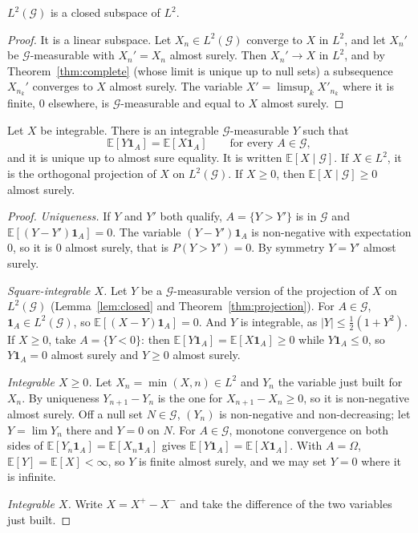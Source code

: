 \begin{lemma}\label{lem:closed}
$L^2(\mathcal G)$ is a closed subspace of $L^2$.
\end{lemma}
\begin{proof}
It is a linear subspace. Let $X_n\in L^2(\mathcal G)$ converge to $X$ in $L^2$, and let $X_n'$ be $\mathcal G$-measurable with $X_n'=X_n$ almost surely. Then
$X_n'\to X$ in $L^2$, and by Theorem~\ref{thm:complete} (whose limit is unique up to null sets) a subsequence $X_{n_k}'$ converges to $X$ almost surely.
The variable $X'=\limsup_kX'_{n_k}$ where it is finite, $0$ elsewhere, is $\mathcal G$-measurable and equal to $X$ almost surely.
\end{proof}

\begin{theorem}\label{thm:condexp}
Let $X$ be integrable. There is an integrable $\mathcal G$-measurable $Y$ such that
\[
\mathbb E[Y\mathbf 1_A]=\mathbb E[X\mathbf 1_A]\qquad\text{for every }A\in\mathcal G,
\]
and it is unique up to almost sure equality. It is written $\mathbb E[X\mid\mathcal G]$. If $X\in L^2$, it is the orthogonal projection of $X$ on
$L^2(\mathcal G)$. If $X\ge0$, then $\mathbb E[X\mid\mathcal G]\ge0$ almost surely.
\end{theorem}
\begin{proof}
\emph{Uniqueness.} If $Y$ and $Y'$ both qualify, $A=\{Y>Y'\}$ is in $\mathcal G$ and $\mathbb E[(Y-Y')\mathbf 1_A]=0$. The variable $(Y-Y')\mathbf 1_A$ is non-negative with
expectation $0$, so it is $0$ almost surely, that is $P(Y>Y')=0$. By symmetry $Y=Y'$ almost surely.

\emph{Square-integrable $X$.} Let $Y$ be a $\mathcal G$-measurable version of the projection of $X$ on $L^2(\mathcal G)$ (Lemma~\ref{lem:closed} and
Theorem~\ref{thm:projection}). For $A\in\mathcal G$, $\mathbf 1_A\in L^2(\mathcal G)$, so $\mathbb E[(X-Y)\mathbf 1_A]=0$. And $Y$ is integrable, as $|Y|\le\frac12(1+Y^2)$. If $X\ge0$, take
$A=\{Y<0\}$: then $\mathbb E[Y\mathbf 1_A]=\mathbb E[X\mathbf 1_A]\ge0$ while $Y\mathbf 1_A\le0$, so $Y\mathbf 1_A=0$ almost surely and $Y\ge0$ almost surely.

\emph{Integrable $X\ge0$.} Let $X_n=\min(X,n)\in L^2$ and $Y_n$ the variable just built for $X_n$. By uniqueness $Y_{n+1}-Y_n$ is the one for $X_{n+1}-X_n\ge0$,
so it is non-negative almost surely. Off a null set $N\in\mathcal G$, $(Y_n)$ is non-negative and non-decreasing; let $Y=\lim Y_n$ there and $Y=0$ on
$N$. For $A\in\mathcal G$, monotone convergence on both sides of $\mathbb E[Y_n\mathbf 1_A]=\mathbb E[X_n\mathbf 1_A]$ gives $\mathbb E[Y\mathbf 1_A]=\mathbb E[X\mathbf 1_A]$. With $A=\Omega$, $\mathbb E[Y]=\mathbb E[X]<\infty$,
so $Y$ is finite almost surely, and we may set $Y=0$ where it is infinite.

\emph{Integrable $X$.} Write $X=X^+-X^-$ and take the difference of the two variables just built.
\end{proof}

